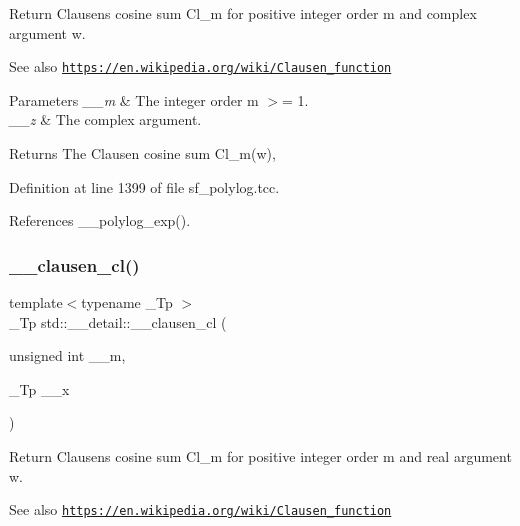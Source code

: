 Return Clausen\textquotesingle{}s cosine sum Cl\+\_\+m for positive integer order m and complex argument w. \begin{DoxySeeAlso}{See also}
\href{https://en.wikipedia.org/wiki/Clausen_function}{\tt https\+://en.\+wikipedia.\+org/wiki/\+Clausen\+\_\+function}
\end{DoxySeeAlso}

\begin{DoxyParams}{Parameters}
{\em \+\_\+\+\_\+m} & The integer order m $>$= 1. \\
\hline
{\em \+\_\+\+\_\+z} & The complex argument. \\
\hline
\end{DoxyParams}
\begin{DoxyReturn}{Returns}
The Clausen cosine sum Cl\+\_\+m(w), 
\end{DoxyReturn}


Definition at line 1399 of file sf\+\_\+polylog.\+tcc.



References \+\_\+\+\_\+polylog\+\_\+exp().

\mbox{\label{namespacestd_1_1____detail_a523b5171a620d8816339c71994e67bb1}} 
\subsubsection{\texorpdfstring{\+\_\+\+\_\+clausen\+\_\+cl()}{\_\_clausen\_cl()}\hspace{0.1cm}{\footnotesize\ttfamily [2/2]}}
{\footnotesize\ttfamily template$<$typename \+\_\+\+Tp $>$ \\
\+\_\+\+Tp std\+::\+\_\+\+\_\+detail\+::\+\_\+\+\_\+clausen\+\_\+cl (\begin{DoxyParamCaption}\item[{unsigned int}]{\+\_\+\+\_\+m,  }\item[{\+\_\+\+Tp}]{\+\_\+\+\_\+x }\end{DoxyParamCaption})}

Return Clausen\textquotesingle{}s cosine sum Cl\+\_\+m for positive integer order m and real argument w. \begin{DoxySeeAlso}{See also}
\href{https://en.wikipedia.org/wiki/Clausen_function}{\tt https\+://en.\+wikipedia.\+org/wiki/\+Clausen\+\_\+function}
\end{DoxySeeAlso}

